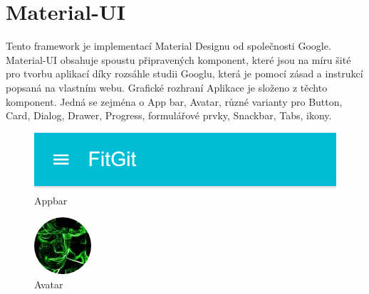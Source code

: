 \section{Material-UI}

Tento framework je implementací Material Designu od společnosti Google. Material-UI obsahuje spoustu připravených komponent, které jsou na míru šité pro tvorbu aplikací díky rozsáhle studii Googlu, která je pomocí zásad a instrukcí popsaná na vlastním webu. Grafické rozhraní Aplikace je složeno z těchto komponent. Jedná se zejména o App bar, Avatar, různé varianty pro Button, Card, Dialog, Drawer, Progress, formulářové prvky, Snackbar, Tabs, ikony.

\begin{figure}[h]
	\centering
	\includegraphics[scale=0.5]{sections/ui/images/Appbar.png}
	\caption{Appbar}
\end{figure}

\begin{figure}[h]
	\centering
	\includegraphics[scale=0.5]{sections/ui/images/Avatar.png}
	\caption{Avatar}
\end{figure}

